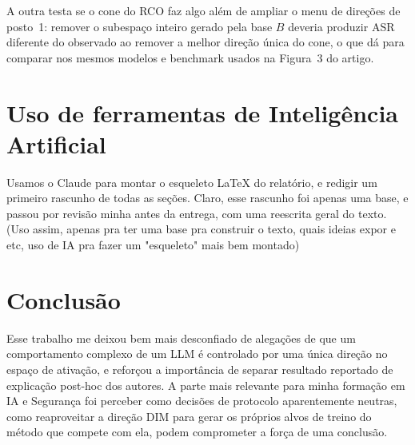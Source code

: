 \documentclass[article,11pt,oneside,a4paper,brazil,section=TITLE]{setup/abntex2}
\begin{document}
A outra testa se o cone do RCO faz algo além de ampliar o menu de direções de posto~1: remover o subespaço inteiro gerado pela base $B$ deveria produzir ASR diferente do observado ao remover a melhor direção única do cone, o que dá para comparar nos mesmos modelos e benchmark usados na Figura~3 do artigo.

\section{Uso de ferramentas de Inteligência Artificial}

Usamos o Claude para montar o esqueleto LaTeX do relatório, e redigir um primeiro rascunho de todas as seções. Claro, esse rascunho foi apenas uma base, e passou por revisão minha antes da entrega, com uma reescrita geral do texto. (Uso assim, apenas pra ter uma base pra construir o texto, quais ideias expor e etc, uso de IA pra fazer um "esqueleto" mais bem montado)

\section{Conclusão}

Esse trabalho me deixou bem mais desconfiado de alegações de que um comportamento complexo de um LLM é controlado por uma única direção no espaço de ativação, e reforçou a importância de separar resultado reportado de explicação post-hoc dos autores. A parte mais relevante para minha formação em IA e Segurança foi perceber como decisões de protocolo aparentemente neutras, como reaproveitar a direção DIM para gerar os próprios alvos de treino do método que compete com ela, podem comprometer a força de uma conclusão.

\printbibliography[title=Referências]
\end{document}
